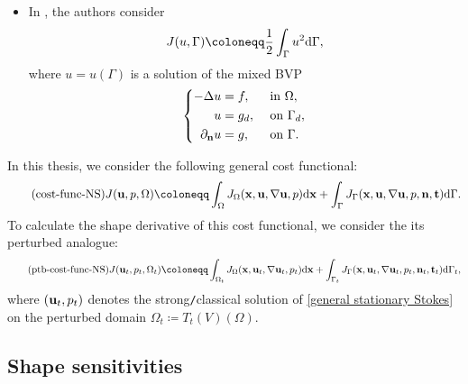 \documentclass[oneside,11pt]{book}
\numberwithin{equation}{section}
\begin{document}
\begin{itemize}
    \item In \cite{Ito_Kunisch_Peichl2006}, the authors consider
    \begin{align*}
        J(u,\Gamma)\coloneqq\frac{1}{2}\int_\Gamma u^2{\rm d}\Gamma,
    \end{align*}
    where $u = u(\Gamma)$ is a solution of the mixed BVP
    \begin{equation*}
        \left\{\begin{split}
            -\Delta u &= f,&&\mbox{ in }\Omega,\\
            u &= g_d,&&\mbox{ on }\Gamma_d,\\
            \partial_{\bf n}u &= g,&&\mbox{ on }\Gamma.
        \end{split}\right.
    \end{equation*}
\end{itemize}
In this thesis, we consider the following general cost functional:
\begin{align}
    \label{general cost functional for u, p}
    \tag{cost-func-NS}
    J({\bf u},p,\Omega)\coloneqq\int_\Omega J_\Omega({\bf x},{\bf u},\nabla{\bf u},p){\rm d}{\bf x} + \int_\Gamma J_\Gamma({\bf x},{\bf u},\nabla{\bf u},p,{\bf n},{\bf t}){\rm d}\Gamma.
\end{align}
To calculate the shape derivative of this cost functional, we consider the its perturbed analogue:
\begin{align}
    \label{perturbed general cost functional for u, p}
    \tag{ptb-cost-func-NS}
    J({\bf u}_t,p_t,\Omega_t)\coloneqq\int_{\Omega_t} J_\Omega({\bf x},{\bf u}_t,\nabla{\bf u}_t,p_t){\rm d}{\bf x} + \int_{\Gamma_t} J_\Gamma({\bf x},{\bf u}_t,\nabla{\bf u}_t,p_t,{\bf n}_t,{\bf t}_t){\rm d}\Gamma_t,
\end{align}
where $({\bf u}_t,p_t)$ denotes the strong\texttt{/}classical solution of \eqref{general stationary Stokes} on the perturbed domain $\Omega_t\coloneqq T_t(V)(\Omega)$.

\subsection{Shape sensitivities}
\end{document}
